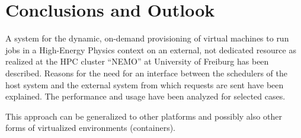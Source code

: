 \section{Conclusions and Outlook}


A system for the dynamic, on-demand provisioning of virtual machines
to run jobs in a High-Energy Physics context on an external, not
dedicated resource as realized at the HPC
cluster ``NEMO'' at University of Freiburg has been described. 
Reasons for the need for an interface between the schedulers of the host system
and the external system from which requests are sent have been
explained. 
The performance and usage have been analyzed for selected cases.

This approach can be generalized to other platforms and possibly also
other forms of virtualized environments (containers).

















